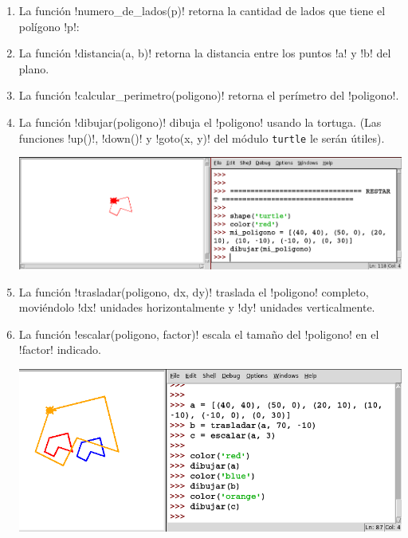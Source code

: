 \documentclass[12pt,spanish]{article}
\begin{document}
  \begin{enumerate}[leftmargin=0pt]

    \item La función \li!numero_de_lados(p)!
      retorna la cantidad de lados que tiene el polígono \li!p!:
      

    \item La función \li!distancia(a, b)!
      retorna la distancia entre los puntos \li!a! y \li!b! del plano.
      

    \item La función \li!calcular_perimetro(poligono)!
      retorna el perímetro del \li!poligono!.
      

    \item La función \li!dibujar(poligono)!
      dibuja el \li!poligono! usando la tortuga.
      (Las funciones \li!up()!, \li!down()! y \li!goto(x, y)!
      del módulo \verb!turtle! le serán útiles).

      \includegraphics[width=\textwidth]{p1}

    \item La función \li!trasladar(poligono, dx, dy)!
      traslada el \li!poligono! completo,
      moviéndolo \li!dx! unidades horizontalmente
      y \li!dy! unidades verticalmente.

    \item La función \li!escalar(poligono, factor)!
      escala el tamaño del \li!poligono!
      en el \li!factor! indicado.

      \includegraphics[width=\textwidth]{p2}


\end{enumerate}
\end{document}
